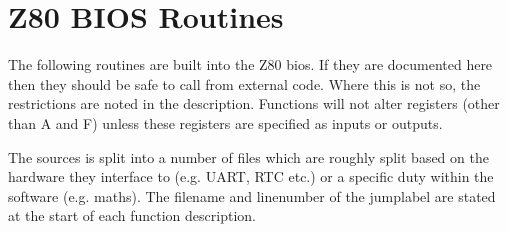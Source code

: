 \documentclass[a4paper,10pt]{book}
\begin{document}


\chapter{Z80 BIOS Routines}
The following routines are built into the Z80 bios.  If they are documented here
then they should be safe to call from external code.  Where this is not so, the
restrictions are noted in the description.  Functions will not alter registers
(other than A and F) unless these registers are specified as inputs or outputs.

The sources is split into a number of files which are roughly split based on the
hardware they interface to (e.g. UART, RTC etc.) or a specific duty within the
software (e.g. maths).  The filename and linenumber of the jumplabel are stated
at the start of each function description.




\end{document}
